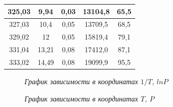 \documentclass[a4paper, fontsize = 14pt]{article}
\begin{document}
\begin{table}[hbt]
{\begin{tabular}{|c|c|c|c|c|}
325,03          & 9,94              & 0,03              & 13104,8           & 65,5                       \\ \hline
327,03          & 10,4              & 0,05              & 13709,5           & 68,5                       \\ \hline
329,02          & 12                & 0,05              & 15819,4           & 79,1                       \\ \hline
331,04          & 13,21             & 0,08              & 17412,0           & 87,1                       \\ \hline
333,02          & 14,49             & 0,08              & 19099,9           & 95,5                       \\ \hline
\end{tabular}
}
\end{table}

\begin{figure}[hbt]\label{risI}
\caption{\textit{График зависимости в координатах $1/T$, $ln{P}$}}
\end{figure}

\begin{figure}[hbt]\label{risI}
\caption{\textit{График зависимости в координатах $T$, $P$}}
\end{figure}
\end{document}
